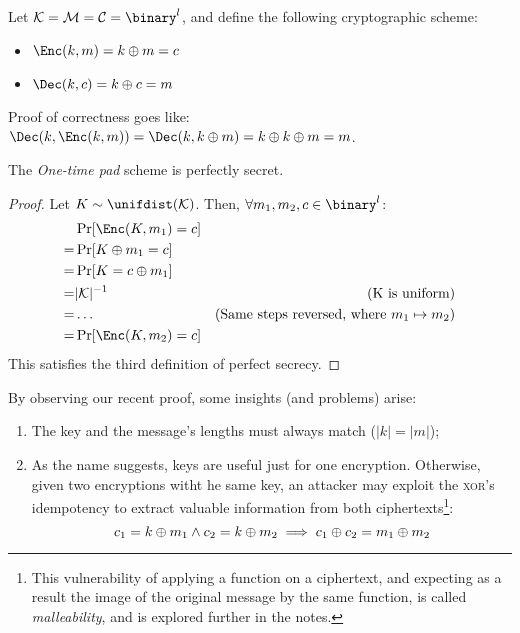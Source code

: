 Let $\K = \M = \C = \binary^l$, and define the following cryptographic scheme:
\begin{itemize}
    \item $\Enc(k, m) = k \xor m = c$
    \item $\Dec(k, c) = k \xor c = m$
\end{itemize}

Proof of correctness goes like: $\Dec(k, \Enc(k, m)) = \Dec(k, k \xor m) = k \xor k \xor m = m$.

\begin{theorem}
    The \emph{One-time pad} scheme is perfectly secret.
\end{theorem}
\begin{proof}
    Let $K \sim \unifdist(\K)$. Then, $\forall m_1, m_2, c \in \binary^l$:
    \begin{align*}
        & \Pr[\Enc(K, m_1) = c]     & \\
        =& \Pr[K \xor m_1 = c]      & \\
        =& \Pr[K = c \xor m_1]      & \\
        =& |\K|^{-1}                & \text{(K is uniform)} \\
        =& \dots                    & \text{(Same steps reversed, where $m_1 \mapsto m_2$)} \\
        =& \Pr[\Enc(K, m_2) = c]    & \\  
    \end{align*}
    This satisfies the third definition of perfect secrecy.
\end{proof}


By observing our recent proof, some insights (and problems) arise:
\begin{enumerate}
    \item The key and the message's lengths must always match ($|k| = |m|$);
    \item As the name suggests, keys are useful just for one encryption. Otherwise, given two encryptions witht he same key, an attacker may exploit the \textsc{xor}'s idempotency to extract valuable information from both ciphertexts\footnote{This vulnerability of applying a function on a ciphertext, and expecting as a result the image of the original message by the same function, is called \emph{malleability}, and is explored further in the notes.}:
    \[
        c_1 = k \oplus m_1 \wedge c_2 = k \oplus m_2 \implies c_1 \oplus c_2 = m_1 \oplus m_2
    \]
    
\end{enumerate}

